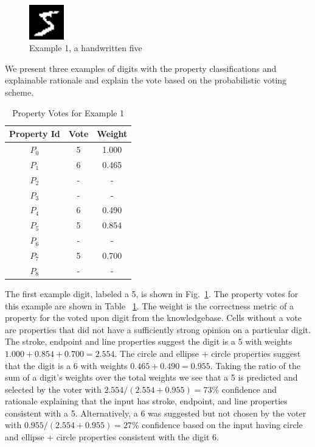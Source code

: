 \documentclass[conference]{IEEEtran}
\begin{document}
 \begin{figure}[htbp]
\centerline{\includegraphics[width=15mm]{./digit-images/5-0.png}}
\caption{Example 1,  a handwritten five}
\label{example1}
\end{figure}

We present three examples of digits with the property classifications and explainable rationale and explain the vote based on the probabilistic voting scheme.

\begin{table}[htbp]
\caption{Property Votes for Example 1}
\centering
\begin{tabular}{| c | c | c |}
\hline
 Property Id & Vote & Weight \\
\hline\hline
$P_0$ & 5 & 1.000 \\ 
\hline
$P_1$ & 6 & 0.465 \\
\hline
$P_2$ & - & - \\
\hline
$P_3$ & - & - \\
\hline
$P_4$ & 6 & 0.490 \\
\hline
$P_5$ & 5 & 0.854 \\
\hline
$P_6$ & - & - \\
\hline
$P_7$ & 5 & 0.700 \\
\hline
$P_8$ & - & - \\
\hline
\end{tabular}
\label{table:example1}
\end{table}

The first example  digit, labeled a 5, is shown in Fig.~\ref{example1}.  The property votes for this example are shown in Table ~\ref{table:example1}.  The weight is the correctness metric of a property for the voted upon digit from the knowledgebase.   Cells without a vote are properties that did not have a sufficiently strong opinion on a particular digit.  The stroke, endpoint and line properties suggest the digit is a 5 with weights $1.000 + 0.854 + 0.700 =  2.554$.  The circle and ellipse + circle properties suggest that the digit is a 6 with weights $0.465 + 0.490 = 0.955$.  Taking the ratio of the sum of a digit's weights over the total weights we see that a 5 is predicted and selected by the voter with  $2.554/(2.554+0.955) = 73\%$ confidence and rationale explaining that the input has stroke, endpoint, and line properties consistent with a 5.  Alternatively, a 6 was suggested but not chosen by the voter with $0.955/(2.554+0.955) = 27\%$ confidence based on the input having circle and ellipse + circle properties consistent with the digit 6.
\end{document}
